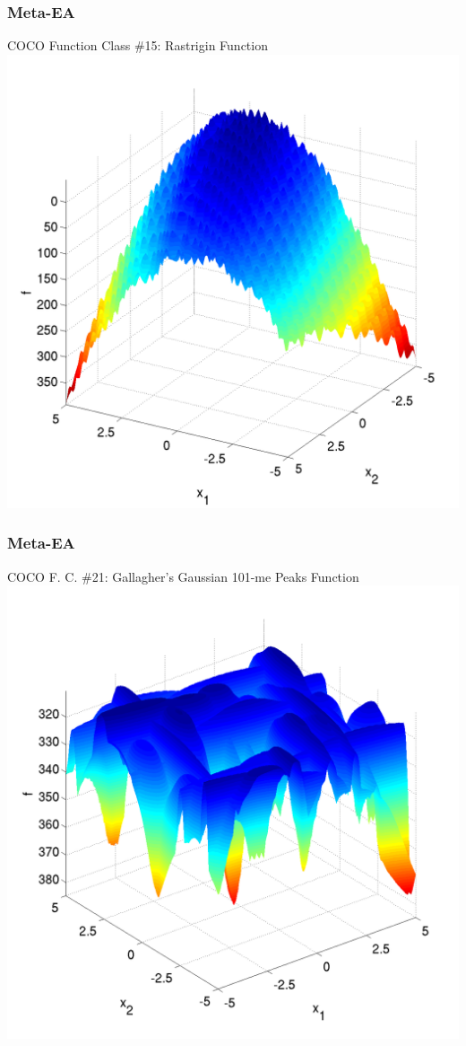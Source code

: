 \documentclass{beamer}
\begin{document}
	\begin{frame}
\frametitle{Meta-EA}
\centering
COCO Function Class \#15: Rastrigin Function
\includegraphics[height=0.8\textheight]{rastrigin_landscape}
\end{frame}	

\begin{frame}
\centering	
\frametitle{Meta-EA}
COCO F. C. \#21: Gallagher's Gaussian 101-me Peaks Function
\includegraphics[height=0.8\textheight]{gallagher_landscape}
\end{frame}		
\end{document}
